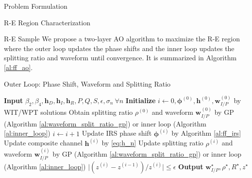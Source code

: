 \documentclass{IEEEtran}
\begin{document}
\begin{section}{Problem Formulation}
\begin{subsection}{R-E Region Characterization}
		\begin{subsubsection}{R-E Sample}
			We propose a two-layer AO algorithm to maximize the R-E region where the outer loop updates the phase shifts and the inner loop updates the splitting ratio and waveform until convergence. It is summarized in Algorithm \ref{al:ff_ao}.
			\begin{algorithm}
				\caption{Outer Loop: Phase Shift, Waveform and Splitting Ratio}
				\label{al:ff_ao}
				\begin{algorithmic}[1]
					\State \textbf{Input} $\beta_2,\beta_4,\boldsymbol{h}_D, \boldsymbol{h}_I, \boldsymbol{h}_R, P, Q, S, \epsilon, \sigma_n \ \forall n$
					\State \textbf{Initialize} $i \gets 0, \boldsymbol{\phi}^{(0)}, \boldsymbol{h}^{(0)}, \boldsymbol{w}_{I/P}^{(0)}$ by WIT/WPT solutions
					\State Obtain splitting ratio $\rho^{(0)}$ and waveform $\boldsymbol{w}_{I/P}^{(0)}$ by GP (Algorithm \ref{al:waveform_split_ratio_gp}) or inner loop (Algorithm \ref{al:inner_loop})
					\Repeat
					\State $i \gets i + 1$
					\State Update IRS phase shift $\boldsymbol{\phi}^{(i)}$ by Algorithm \ref{al:ff_irs}
					\State Update composite channel $\boldsymbol{h}^{(i)}$ by \ref{eq:h_n}
					\State Update splitting ratio $\rho^{(i)}$ and waveform $\boldsymbol{w}_{I/P}^{(i)}$ by GP (Algorithm \ref{al:waveform_split_ratio_gp}) or inner loop (Algorithm \ref{al:inner_loop})
					\Until $\lvert (z^{(i)}-z^{(i-1)}) / z^{(i)} \rvert \le \epsilon$
					\State \textbf{Output} $\boldsymbol{w}_{I/P}^{\star}, \rho^{\star}, R^{\star}, z^{\star}$
				\end{algorithmic}
			\end{algorithm}
		\end{subsubsection}
	\end{subsection}
\end{section}



\end{document}
